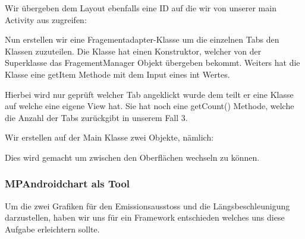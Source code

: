 

Wir übergeben dem Layout ebenfalls eine ID auf die wir von unserer main Activity aus zugreifen: 




Nun erstellen wir eine Fragementadapter-Klasse um die einzelnen Tabs den Klassen zuzuteilen. 
Die Klasse hat einen Konstruktor, welcher von der Superklasse das FragementManager Objekt übergeben bekommt.
Weiters hat die Klasse eine getItem Methode mit dem Input eines int Wertes. 


Hierbei wird nur geprüft welcher Tab angeklickt wurde dem teilt er eine Klasse auf welche eine eigene View hat. 
Sie hat noch eine getCount() Methode, welche die Anzahl der Tabs zurückgibt in unserem Fall 3.


Wir erstellen auf der Main Klasse zwei Objekte, nämlich:


Dies wird gemacht um zwischen den Oberflächen wechseln zu können.

 
\subsubsection{MPAndroidchart als Tool}
Um die zwei Grafiken für den Emissionsausstoss und die Längsbeschleunigung darzustellen, haben wir uns für ein Framework entschieden welches uns diese Aufgabe erleichtern sollte.

